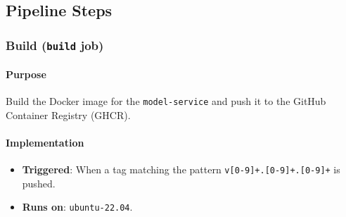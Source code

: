 \subsection{Pipeline Steps}

\subsubsection{Build (\texttt{build} job)}

\paragraph{Purpose}
Build the Docker image for the \texttt{model-service} and push it to the GitHub Container Registry (GHCR).

\paragraph{Implementation}
\begin{itemize}
    \item \textbf{Triggered}: When a tag matching the pattern \texttt{v[0-9]+.[0-9]+.[0-9]+} is pushed.
    \item \textbf{Runs on}: \texttt{ubuntu-22.04}.
\end{itemize}

